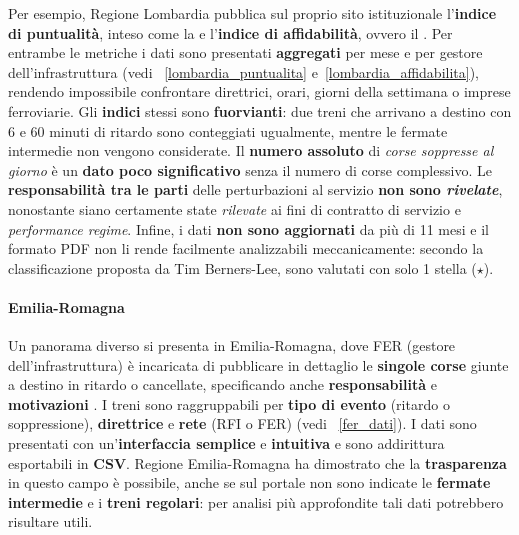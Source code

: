 \documentclass[12pt,italian]{report}
\begin{document}
Per esempio, Regione Lombardia pubblica sul proprio sito istituzionale
\cite{LombardiaDati} l'\textbf{indice di puntualità}, inteso come la
 e
l'\textbf{indice di affidabilità}, ovvero il .  Per entrambe le metriche i
dati sono presentati \textbf{aggregati} per mese e per gestore
dell'infrastruttura (vedi \figurename~\ref{lombardia_puntualita}
e~\ref{lombardia_affidabilita}), rendendo impossibile confrontare
direttrici, orari, giorni della settimana o imprese ferroviarie.  Gli
\textbf{indici} stessi sono \textbf{fuorvianti}: due treni che
arrivano a destino con 6 e 60 minuti di ritardo sono conteggiati
ugualmente, mentre le fermate intermedie non vengono considerate.  Il
\textbf{numero assoluto} di \textit{corse soppresse al giorno} è un
\textbf{dato poco significativo} senza il numero di corse complessivo.
Le \textbf{responsabilità tra le parti} delle perturbazioni al
servizio \textbf{non sono \textit{rivelate}}, nonostante siano
certamente state \textit{rilevate} ai fini di contratto di servizio e
\textit{performance regime}.  Infine, i dati \textbf{non sono
    aggiornati} da più di 11 mesi e il formato PDF non li rende
facilmente analizzabili meccanicamente: secondo la classificazione
proposta da Tim Berners-Lee, sono valutati con solo 1 stella
($\star$).

\paragraph{Emilia-Romagna}
Un panorama diverso si presenta in Emilia-Romagna, dove FER (gestore
dell'infrastruttura) è incaricata di pubblicare in dettaglio le
\textbf{singole corse} giunte a destino in ritardo o cancellate,
specificando anche \textbf{responsabilità} e \textbf{motivazioni}
\cite{FerDati}.  I treni sono raggruppabili per \textbf{tipo di
    evento} (ritardo o soppressione), \textbf{direttrice} e
\textbf{rete} (RFI o FER) (vedi \figurename~\ref{fer_dati}).  I dati
sono presentati con un'\textbf{interfaccia semplice} e
\textbf{intuitiva} e sono addirittura esportabili in \textbf{CSV}.
Regione Emilia-Romagna ha dimostrato che la \textbf{trasparenza} in
questo campo è possibile, anche se sul portale non sono indicate le
\textbf{fermate intermedie} e i \textbf{treni regolari}: per analisi
più approfondite tali dati potrebbero risultare utili.
\end{document}
